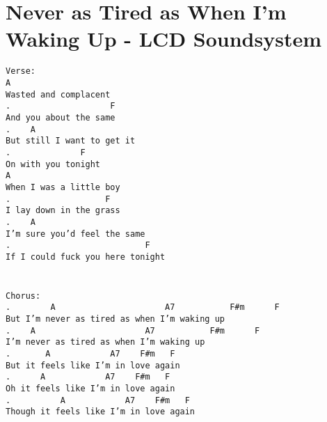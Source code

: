 \newpage
\section{Never as Tired as When I'm Waking Up - LCD Soundsystem}
\label{Never as Tired as When I'm Waking Up - LCD Soundsystem}
\texttt{Verse:\\
A\\
Wasted\ and\ complacent\\
. \ \ \ \ \ \ \ \ \ \ \ \ \ \ \ \ \ \ \ F\\
And\ you\ about\ the\ same\\
. \ \ \ A\\
But\ still\ I\ want\ to\ get\ it\\
. \ \ \ \ \ \ \ \ \ \ \ \ \ F\\
On\ with\ you\ tonight\\
A\\
When\ I\ was\ a\ little\ boy\\
. \ \ \ \ \ \ \ \ \ \ \ \ \ \ \ \ \ \ F\\
I\ lay\ down\ in\ the\ grass\\
. \ \ \ A\\
I'm\ sure\ you'd\ feel\ the\ same\ \\
. \ \ \ \ \ \ \ \ \ \ \ \ \ \ \ \ \ \ \ \ \ \ \ \ \ \ F\\
If\ I\ could\ fuck\ you\ here\ tonight\\
\\
\\
Chorus:\\
. \ \ \ \ \ \ \ A\ \ \ \ \ \ \ \ \ \ \ \ \ \ \ \ \ \ \ \ \ \ A7\ \ \ \ \ \ \ \ \ \ \ F\#m\ \ \ \ \ \ F\\
But\ I'm\ never\ as\ tired\ as\ when\ I'm\ waking\ up\\
. \ \ \ A\ \ \ \ \ \ \ \ \ \ \ \ \ \ \ \ \ \ \ \ \ \ A7\ \ \ \ \ \ \ \ \ \ \ F\#m\ \ \ \ \ \ F\\
I'm\ never\ as\ tired\ as\ when\ I'm\ waking\ up\\
. \ \ \ \ \ \ A\ \ \ \ \ \ \ \ \ \ \ \ A7\ \ \ \ F\#m\ \ \ F\\
But\ it\ feels\ like\ I'm\ in\ love\ again\\
. \ \ \ \ \ A\ \ \ \ \ \ \ \ \ \ \ \ A7\ \ \ \ F\#m\ \ \ F\\
Oh\ it\ feels\ like\ I'm\ in\ love\ again\\
. \ \ \ \ \ \ \ \ \ A\ \ \ \ \ \ \ \ \ \ \ \ A7\ \ \ \ F\#m\ \ \ F\\
Though\ it\ feels\ like\ I'm\ in\ love\ again\\
}
